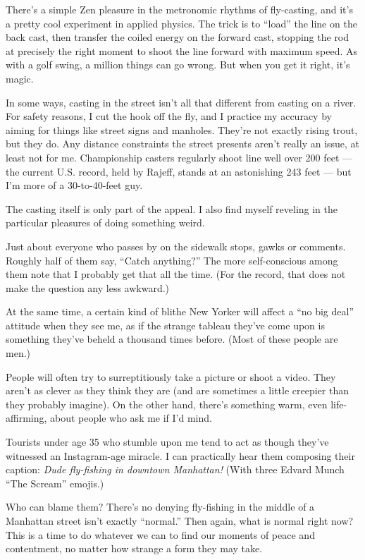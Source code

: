 There's a simple Zen pleasure in the metronomic rhythms of fly-casting,
and it's a pretty cool experiment in applied physics. The trick is to
``load'' the line on the back cast, then transfer the coiled energy on
the forward cast, stopping the rod at precisely the right moment to
shoot the line forward with maximum speed. As with a golf swing, a
million things can go wrong. But when you get it right, it's magic.

In some ways, casting in the street isn't all that different from
casting on a river. For safety reasons, I cut the hook off the fly, and
I practice my accuracy by aiming for things like street signs and
manholes. They're not exactly rising trout, but they do. Any distance
constraints the street presents aren't really an issue, at least not for
me. Championship casters regularly shoot line well over 200 feet --- the
current U.S. record, held by Rajeff, stands at an astonishing 243 feet
--- but I'm more of a 30-to-40-feet guy.

The casting itself is only part of the appeal. I also find myself
reveling in the particular pleasures of doing something weird.

Just about everyone who passes by on the sidewalk stops, gawks or
comments. Roughly half of them say, ``Catch anything?'' The more
self-conscious among them note that I probably get that all the time.
(For the record, that does not make the question any less awkward.)

At the same time, a certain kind of blithe New Yorker will affect a ``no
big deal'' attitude when they see me, as if the strange tableau they've
come upon is something they've beheld a thousand times before. (Most of
these people are men.)

People will often try to surreptitiously take a picture or shoot a
video. They aren't as clever as they think they are (and are sometimes a
little creepier than they probably imagine). On the other hand, there's
something warm, even life-affirming, about people who ask me if I'd
mind.

Tourists under age 35 who stumble upon me tend to act as though they've
witnessed an Instagram-age miracle. I can practically hear them
composing their caption: \emph{Dude fly-fishing in downtown Manhattan!}
(With three Edvard Munch ``The Scream'' emojis.)

Who can blame them? There's no denying fly-fishing in the middle of a
Manhattan street isn't exactly ``normal.'' Then again, what is normal
right now? This is a time to do whatever we can to find our moments of
peace and contentment, no matter how strange a form they may take.

